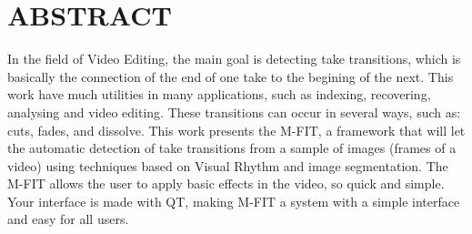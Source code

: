 \chapter*{\centering ABSTRACT \label{abstract}}

\hspace*{1.25cm}In the field of Video Editing, the main goal is
detecting take transitions, which is basically the connection of the
end of one take to the begining of the next. This work have much
utilities in many applications, such as indexing, recovering,
analysing and video editing. These transitions can occur in several
ways, such as: cuts, fades, and dissolve. This work presents the
M-FIT, a framework that will let the automatic detection of take
transitions from a sample of images (frames of a video) using
techniques based on Visual Rhythm and image segmentation. The M-FIT
allows the user to apply basic effects in the video, so quick and
simple. Your interface is made with QT, making M-FIT a system with a
simple interface and easy for all users.
